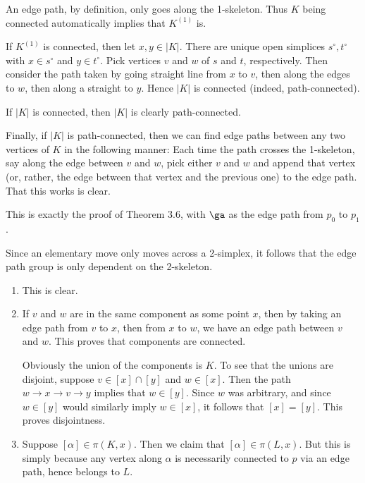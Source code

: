\documentclass[../../solutions.tex]{subfiles}
\begin{document}
\begin{exercise} \leavevmode
An edge path, by definition, only goes along the 1-skeleton.
Thus $K$ being connected automatically implies that $K^{(1)}$ is.

If $K^{(1)}$ is connected, then let $x,y\in|K|$.
There are unique open simplices $s^\circ,t^\circ$ with $x\in s^\circ$ and $y\in t^\circ$.
Pick vertices $v$ and $w$ of $s$ and $t$, respectively.
Then consider the path taken by going straight line from $x$ to $v$, then along the edges to $w$, then along a straight to $y$.
Hence $|K|$ is connected (indeed, path-connected).

If $|K|$ is connected, then $|K|$ is clearly path-connected.

Finally, if $|K|$ is path-connected, then we can find edge paths between any two vertices of $K$ in the following manner:
Each time the path crosses the 1-skeleton, say along the edge between $v$ and $w$, pick either $v$ and $w$ and append that vertex (or, rather, the edge between that vertex and the previous one) to the edge path.
That this works is clear.
\end{exercise}

\begin{exercise} \leavevmode
This is exactly the proof of Theorem 3.6, with $\ga$ as the edge path from $p_0$ to $p_1$.
\end{exercise}

\begin{exercise} \leavevmode
Since an elementary move only moves across a 2-simplex, it follows that the edge path group is only dependent on the 2-skeleton.
\end{exercise}

\begin{exercise} \leavevmode
\begin{enumerate}
\item
This is clear.

\item
If $v$ and $w$ are in the same component as some point $x$, then by taking an edge path from $v$ to $x$, then from $x$ to $w$, we have an edge path between $v$ and $w$.
This proves that components are connected.

Obviously the union of the components is $K$.
To see that the unions are disjoint, suppose $v\in[x]\cap[y]$ and $w\in[x]$.
Then the path $w\to x\to v\to y$ implies that $w\in[y]$.
Since $w$ was arbitrary, and since $w\in[y]$ would similarly imply $w\in[x]$, it follows that $[x]=[y]$.
This proves disjointness.

\item
Suppose $[\alpha]\in\pi(K,x)$.
Then we claim that $[\alpha]\in\pi(L,x)$.
But this is simply because any vertex along $\alpha$ is necessarily connected to $p$ via an edge path, hence belongs to $L$.
\end{enumerate}
\end{exercise}
\end{document}
